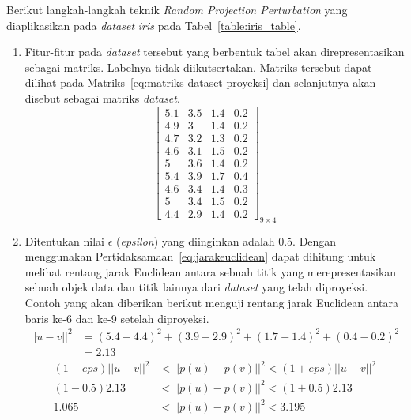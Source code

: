 Berikut langkah-langkah teknik \textit{Random Projection Perturbation} yang diaplikasikan pada \textit{dataset} \textit{iris} pada Tabel~\ref{table:iris_table}.
\begin{enumerate}
    \item Fitur-fitur pada \textit{dataset} tersebut yang berbentuk tabel akan direpresentasikan sebagai matriks. Labelnya tidak diikutsertakan. Matriks tersebut dapat dilihat pada Matriks~\ref{eq:matriks-dataset-proyeksi} dan selanjutnya akan disebut sebagai matriks \textit{dataset}.
    \begin{equation}\label{eq:matriks-dataset-proyeksi}
        \begin{bmatrix}
        5.1		&		3.5		&		1.4		&		0.2	\\
        4.9		&		3		&		1.4		&		0.2	\\
        4.7		&		3.2		&		1.3		&		0.2	\\
        4.6		&		3.1		&		1.5		&		0.2	\\
        5		&		3.6		&		1.4		&		0.2	\\
        5.4		&		3.9		&		1.7		&		0.4	\\
        4.6		&		3.4		&		1.4		&		0.3	\\
        5		&		3.4		&		1.5		&		0.2	\\
        4.4		&		2.9		&		1.4		&		0.2 
        \end{bmatrix}_{9\times 4}
    \end{equation}
    \item Ditentukan nilai \(\epsilon\) (\textit{epsilon}) yang diinginkan adalah 0.5. Dengan menggunakan Pertidaksamaan~\ref{eq:jarakeuclidean} dapat dihitung untuk melihat rentang jarak Euclidean antara sebuah titik yang merepresentasikan sebuah objek data dan titik lainnya dari \textit{dataset} yang telah diproyeksi. Contoh yang akan diberikan berikut menguji rentang jarak Euclidean antara baris ke-6 dan ke-9 setelah diproyeksi.
    \begin{align*}
        ||u - v||^{2} &= (5.4-4.4)^2 + (3.9-2.9)^2 + (1.7-1.4)^2 + (0.4-0.2)^2
        \\
        &= 2.13
    \end{align*}
    \begin{align*}
        (1-eps)||u - v||^{2}&<||p(u) - p(v)||^{2}<(1+eps)||u - v||^{2}
        \\
        (1-0.5)2.13&<||p(u) - p(v)||^{2}<(1+0.5)2.13
        \\
        1.065&<||p(u) - p(v)||^{2}<3.195
    \end{align*}

\end{enumerate}
